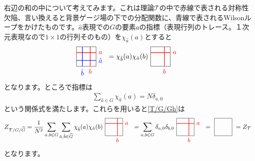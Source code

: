 \documentclass[report,paper=a4, fontsize=12pt, line_length=16cm, number_of_lines=33,dvipdfmx]{jlreq}
\numberwithin{equation}{chapter}
\newcommand{\Gh}{\widehat{G}}
\newcommand{\ah}{\hat{a}}
\newcommand{\bh}{\hat{b}}
\newcommand{\Tcal}{\mathcal{T}}
\begin{document}
右辺の和の中について考えてみます。これは理論$\Tcal$の中で赤線で表される対称性欠陥、言い換えると背景ゲージ場の下での分配関数に、青線で表されるWilsonループをかけたものです。$\ah$表現での$G$の要素$a$の指標（表現行列のトレース。１次元表現なので$1\times 1$の行列そのもの）を$\chi_{\ah}(a)$とすると
\begin{align}
  \ 
  \begin{tikzpicture}[baseline=0.4cm]
    \draw (0,0) rectangle (1,1);   
    \draw[thick,red] (0,0.7)--(1,0.7) node[right]{$a$}; 
    \draw[thick,red] (0.7,0) node[below]{$b$}--(0.7,1); 
    \draw[thick,blue] (0,0.3)--(1,0.3) node[right]{$\ah$}; 
    \draw[thick,blue] (0.3,0) node[below]{$\bh$}--(0.3,1); 
  \end{tikzpicture}
  \ 
  = \chi_{\bh}(a)\chi_{\ah}(b)
  \ 
  \begin{tikzpicture}[baseline=0.4cm]
    \draw (0,0) rectangle (1,1);   
    \draw[thick,red] (0,0.7)--(1,0.7) node[right]{$a$}; 
    \draw[thick,red] (0.7,0) node[below]{$b$}--(0.7,1);
  \end{tikzpicture}
  \ 
\end{align}
となります。ところで指標は
\begin{align}
  \sum_{\ah \in G}\chi_{\ah}(a)=N\delta_{a,0}
\end{align}
という関係式を満たします。これらを用いると\eqref{T/G/Gh}は
\begin{align}
  Z_{\Tcal/G/\Gh}
  =\frac{1}{N^2}\sum_{a,b\in G}\sum_{\ah, \bh \in \Gh}
  \chi_{\bh}(a)\chi_{\ah}(b)
  \ 
  \begin{tikzpicture}[baseline=0.4cm]
    \draw (0,0) rectangle (1,1);   
    \draw[thick,red] (0,0.7)--(1,0.7) node[right]{$a$}; 
    \draw[thick,red] (0.7,0) node[below]{$b$}--(0.7,1); 
  \end{tikzpicture}
  \ 
  =\sum_{a,b\in G}\delta_{a,0}\delta_{b,0}
  \ 
  \begin{tikzpicture}[baseline=0.4cm]
    \draw (0,0) rectangle (1,1);   
    \draw[thick,red] (0,0.7)--(1,0.7) node[right]{$a$}; 
    \draw[thick,red] (0.7,0) node[below]{$b$}--(0.7,1); 
  \end{tikzpicture}
  \ 
  =
  \ 
  \begin{tikzpicture}[baseline=0.4cm]
    \draw (0,0) rectangle (1,1);   
  \end{tikzpicture}
  \ 
  =Z_{\Tcal}
\end{align}
となります。
\end{document}
